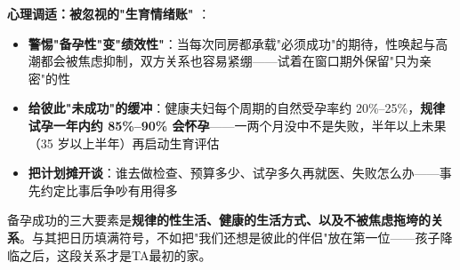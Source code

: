 \vspace{0.5em}
\noindent\textbf{心理调适：被忽视的"生育情绪账" }：

\begin{itemize}
	\item \textbf{警惕"备孕性"变"绩效性"}：当每次同房都承载"必须成功"的期待，性唤起与高潮都会被焦虑抑制，双方关系也容易紧绷——试着在窗口期外保留"只为亲密"的性
	\item \textbf{给彼此"未成功"的缓冲}：健康夫妇每个周期的自然受孕率约 20\%--25\%，\textbf{规律试孕一年内约 85\%--90\% 会怀孕}——一两个月没中不是失败，半年以上未果（35 岁以上半年）再启动生育评估
	\item \textbf{把计划摊开谈}：谁去做检查、预算多少、试孕多久再就医、失败怎么办——事先约定比事后争吵有用得多
\end{itemize}

\begin{tcolorbox}[colback=pink!5!white,colframe=red!50!black,title=贴心小叮咛]
备孕成功的三大要素是\textbf{规律的性生活、健康的生活方式、以及不被焦虑拖垮的关系}。与其把日历填满符号，不如把"我们还想是彼此的伴侣"放在第一位——孩子降临之后，这段关系才是TA最初的家。
\end{tcolorbox}

